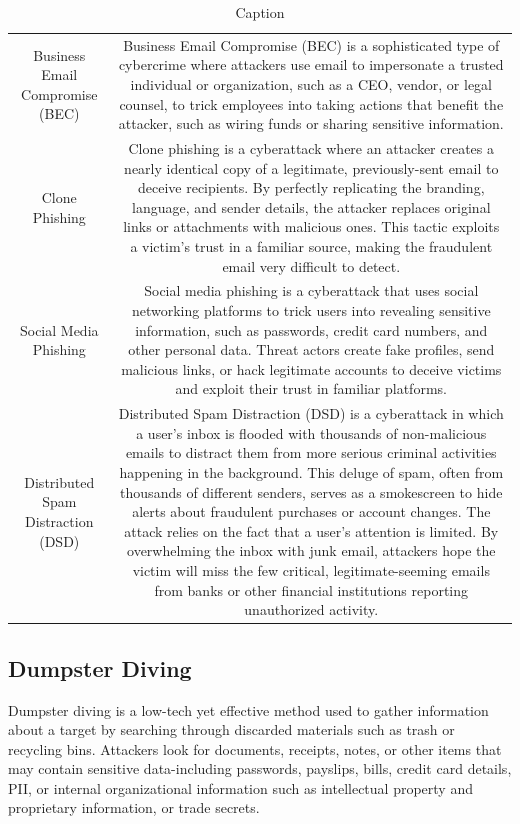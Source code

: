 \begin{table}
\begin{tabular}{cc}
         Business Email Compromise (BEC)& Business Email Compromise (BEC) is a sophisticated type of cybercrime where attackers use email to impersonate a trusted individual or organization, such as a CEO, vendor, or legal counsel, to trick employees into taking actions that benefit the attacker, such as wiring funds or sharing sensitive information.\\
         Clone Phishing& Clone phishing is a cyberattack where an attacker creates a nearly identical copy of a legitimate, previously-sent email to deceive recipients. By perfectly replicating the branding, language, and sender details, the attacker replaces original links or attachments with malicious ones. This tactic exploits a victim's trust in a familiar source, making the fraudulent email very difficult to detect.\\
         Social Media Phishing& Social media phishing is a cyberattack that uses social networking platforms to trick users into revealing sensitive information, such as passwords, credit card numbers, and other personal data. Threat actors create fake profiles, send malicious links, or hack legitimate accounts to deceive victims and exploit their trust in familiar platforms.\\
         Distributed Spam Distraction (DSD)& Distributed Spam Distraction (DSD) is a cyberattack in which a user's inbox is flooded with thousands of non-malicious emails to distract them from more serious criminal activities happening in the background. This deluge of spam, often from thousands of different senders, serves as a smokescreen to hide alerts about fraudulent purchases or account changes. The attack relies on the fact that a user's attention is limited. By overwhelming the inbox with junk email, attackers hope the victim will miss the few critical, legitimate-seeming emails from banks or other financial institutions reporting unauthorized activity.\\
    \end{tabular}
    \caption{Caption}
    \label{tab:placeholder}
\end{table}
\subsection{Dumpster Diving}
Dumpster diving is a low-tech yet effective method used to gather information about a target by searching through discarded materials such as trash or recycling bins. Attackers look for documents, receipts, notes, or other items that may contain sensitive data-including passwords, payslips, bills, credit card details, PII, or internal organizational information such as intellectual property and proprietary information, or trade secrets.

